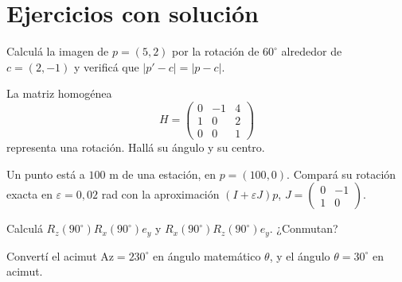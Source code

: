 \section{Ejercicios con solución}

\begin{ejercicio}
Calculá la imagen de \(p=(5,2)\) por la rotación de \(60^\circ\) alrededor de \(c=(2,-1)\) y
verificá que \(|p'-c|=|p-c|\).
\end{ejercicio}

\begin{ejercicio}
La matriz homogénea
\[
H=\begin{pmatrix}0&-1&4\\1&0&2\\0&0&1\end{pmatrix}
\]
representa una rotación. Hallá su
ángulo y su centro.
\end{ejercicio}

\begin{ejercicio}
Un punto está a \(100\) m de una estación, en \(p=(100,0)\). Compará su rotación exacta en
\(\varepsilon=0{,}02\) rad con la aproximación \((I+\varepsilon J)p\),
\(J=\left(\begin{smallmatrix}0&-1\\1&0\end{smallmatrix}\right)\).
\end{ejercicio}

\begin{ejercicio}
Calculá \(R_z(90^\circ)R_x(90^\circ)e_y\) y \(R_x(90^\circ)R_z(90^\circ)e_y\). ¿Conmutan?
\end{ejercicio}

\begin{ejercicio}
Convertí el acimut \(\mathrm{Az}=230^\circ\) en ángulo matemático \(\theta\), y el ángulo
\(\theta=30^\circ\) en acimut.
\end{ejercicio}
